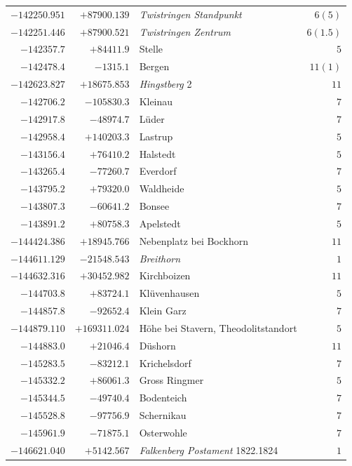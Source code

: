 \begin{center}
\begin{tabular}{r|r|p{170pt}|r}
\(-142250.951\)&\(+87900.139\)&\textit{Twistringen Standpunkt}&\(6 (5)\)\\
\(-142251.446\)&\(+87900.521\)&\textit{Twistringen Zentrum}&\(6(1.5)\)\\
\(-142357.7\)&\(+84411.9\)&Stelle&\(5\)\\
\(-142478.4\)&\(-1315.1\)&Bergen&\(11 (1)\)\\
\(-142623.827\)&\(+18675.853\)&\textit{Hingstberg} 2&\(11\)\\
\(-142706.2\)&\(-105830.3\)&Kleinau&\(7\)\\
\(-142917.8\)&\(-48974.7\)&Lüder&\(7\)\\
\(-142958.4\)&\(+140203.3\)&Lastrup&\(5\)\\
\(-143156.4\)&\(+76410.2\)&Halstedt&\(5\)\\
\(-143265.4\)&\(-77260.7\)&Everdorf&\(7\)\\
\(-143795.2\)&\(+79320.0\)&Waldheide&\(5\)\\
\(-143807.3\)&\(-60641.2\)&Bonsee&\(7\)\\
\(-143891.2\)&\(+80758.3\)&Apelstedt&\(5\)\\
\(-144424.386\)&\(+18945.766\)&Nebenplatz bei Bockhorn&\(11\)\\
\(-144611.129\)&\(-21548.543\)&\textit{Breithorn}&\(1\)\\
\(-144632.316\)&\(+30452.982\)&Kirchboizen&\(11\)\\
\(-144703.8\)&\(+83724.1\)&Klüvenhausen&\(5\)\\
\(-144857.8\)&\(-92652.4\)&Klein Garz&\(7\)\\
\(-144879.110\)&\(+169311.024\)&Höhe bei Stavern, Theodolitstandort&\(5\)\\
\(-144883.0\)&\(+21046.4\)&Düshorn&\(11\)\\
\(-145283.5\)&\(-83212.1\)&Krichelsdorf&\(7\)\\
\(-145332.2\)&\(+86061.3\)&Gross Ringmer&\(5\)\\
\(-145344.5\)&\(-49740.4\)&Bodenteich&\(7\)\\
\(-145528.8\)&\(-97756.9\)&Schernikau&\(7\)\\
\(-145961.9\)&\(-71875.1\)&Osterwohle&\(7\)\\
\(-146621.040\)&\(+5142.567\)&\textit{Falkenberg Postament} 1822.1824&\(1\)\\
\hline\end{tabular}\endgroup\end{center}
